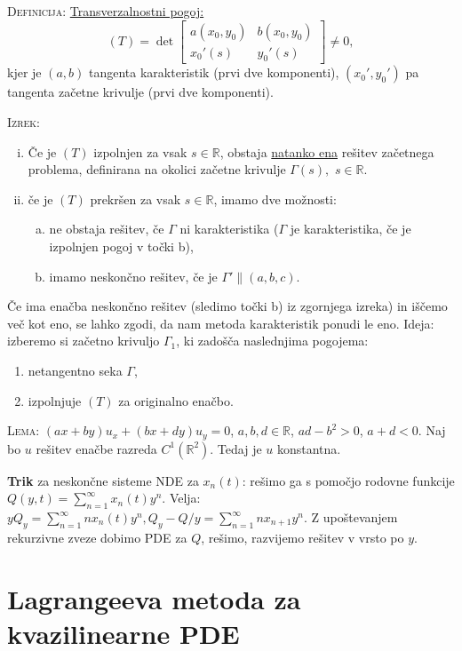 \documentclass[8pt,a4paper]{amsart}
\theoremstyle{definition} %
\theoremstyle{plain} %
\newcommand{\R}{\mathbb R}
\begin{document}
\textsc{Definicija:} \underline{Transverzalnostni pogoj:} $$ (T) = \det{
  \begin{bmatrix} a(x_0,y_0) & b(x_0,y_0) \\ x_0'(s) & y_0'(s) \end{bmatrix} }
  \neq 0, $$ kjer je $(a,b)$ tangenta karakteristik (prvi dve komponenti),
  $(x_0',y_0')$ pa tangenta začetne krivulje (prvi dve komponenti).

\textsc{Izrek:}
\begin{enumerate}[(i)]
  \item Če je $(T)$ izpolnjen za vsak $s
    \in \R$, obstaja \underline{natanko ena} rešitev začetnega problema,
    definirana na okolici začetne krivulje $\Gamma (s),$ $s \in \R$.
  \item če je $(T)$ prekršen za vsak $s \in \R$, imamo dve možnosti:
    \begin{enumerate}[a)]
      \item ne obstaja rešitev, če $\Gamma$ ni karakteristika ($\Gamma$ je
        karakteristika, če je izpolnjen pogoj v točki b),
      \item imamo neskončno rešitev, če je $\Gamma' \| (a,b,c)$.
    \end{enumerate}
\end{enumerate}

Če ima enačba neskončno rešitev (sledimo točki b) iz zgornjega izreka) in iščemo
več kot eno, se lahko zgodi, da nam metoda karakteristik ponudi le eno. Ideja:
izberemo si začetno krivuljo $\Gamma_1$, ki zadošča naslednjima pogojema:
\begin{enumerate}
  \item netangentno seka $\Gamma$,
  \item izpolnjuje $(T)$ za originalno enačbo.
\end{enumerate}

\textsc{Lema:} $(ax + by) u_x + (bx + dy) u_y = 0$, $a,b,d \in \R$, $ad-b^2 >
0$, $a+d < 0$. Naj bo $u$ rešitev enačbe razreda $C^1 (\R^2)$. Tedaj je $u$
konstantna.

\textbf{Trik} za neskončne sisteme NDE za $x_n(t)$: rešimo ga s pomočjo rodovne
funkcije $Q(y,t) = \sum_{n=1}^\infty x_n(t) y^n$. Velja: $yQ_y =
\sum_{n=1}^\infty nx_n(t)y^n, Q_y - Q / y = \sum_{n=1}^\infty nx_{n+1}y^n$.
Z upoštevanjem rekurzivne zveze dobimo PDE za $Q$, rešimo, razvijemo rešitev v
vrsto po $y$.

\section*{Lagrangeeva metoda za kvazilinearne PDE}
\end{document}
